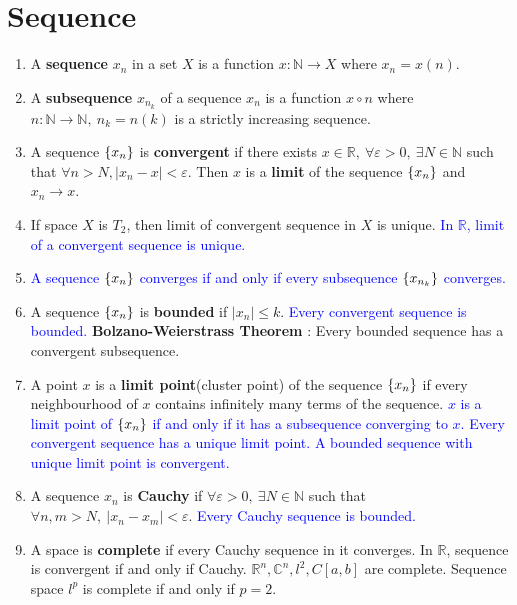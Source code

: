 \section{Sequence}
\begin{enumerate}
	\item A \textbf{sequence} $x_n$ in a set $X$ is a function $x : \mathbb{N} \to X$ where $x_n = x(n)$.
	\item A \textbf{subsequence} $x_{n_k}$ of a sequence $x_n$ is a function $x \circ n$ where $n : \mathbb{N}\to \mathbb{N},\ n_k = n(k)$ is a strictly increasing sequence.
	\item A sequence $\{x_n\}$ is \textbf{convergent} if there exists $x \in \mathbb{R},\ \forall \varepsilon > 0,\ \exists N \in \mathbb{N}$ such that $\forall n > N, |x_n-x| < \varepsilon$.
	 Then $x$ is a \textbf{limit} of the sequence $\{x_n\}$ and $x_n \to x$.
	\item If space $X$ is $T_2$, then limit of convergent sequence in $X$ is unique.
		\subitem \textcolor{blue}{In $\mathbb{R}$, limit of a convergent sequence is unique.}
	\item \textcolor{blue}{A sequence $\{x_n\}$ converges if and only if every subsequence $\{x_{n_k}\}$ converges.}
	\item A sequence $\{x_n\}$ is \textbf{bounded} if $|x_n| \le k$.
		\subitem \textcolor{blue}{Every convergent sequence is bounded.}
		\subitem \textbf{Bolzano-Weierstrass Theorem} : Every bounded sequence has a convergent subsequence.
	\item A point $x$ is a \textbf{limit point}(cluster point) of the sequence $\{x_n\}$ if every neighbourhood of $x$ contains infinitely many terms of the sequence.
		\subitem \textcolor{blue}{$x$ is a limit point of $\{x_n\}$ if and only if it has a subsequence converging to $x$.}
		\subitem \textcolor{blue}{Every convergent sequence has a unique limit point.}
		\subitem \textcolor{blue}{A bounded sequence with unique limit point is convergent.}
	\item A sequence $x_n$ is \textbf{Cauchy} if $\forall \varepsilon > 0,\ \exists N \in \mathbb{N}$ such that $\forall n,m >N,\ |x_n-x_m| < \varepsilon$.
		\subitem \textcolor{blue}{Every Cauchy sequence is bounded.}
	\item A space is \textbf{complete} if every Cauchy sequence in it converges.
		\subitem In $\mathbb{R}$, sequence is convergent if and only if Cauchy.
		\subitem $\mathbb{R}^n,\mathbb{C}^n,l^2,C[a,b]$ are complete.
		\subitem Sequence space $l^p$ is complete if and only if $p=2$.

\end{enumerate}
